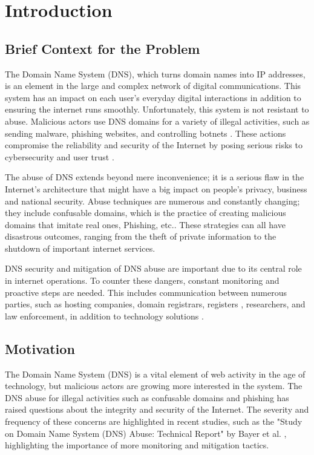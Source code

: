 \chapter{Introduction}


\section{Brief Context for the Problem}

The Domain Name System (DNS), which turns domain names into IP addresses, is an element in the large and complex network of digital communications. This system has an impact on each user's everyday digital interactions in addition to ensuring the internet runs smoothly. Unfortunately, this system is not resistant to abuse. Malicious actors use DNS domains for a variety of illegal activities, such as sending malware, phishing websites, and controlling botnets \cite{so2022}. These actions compromise the reliability and security of the Internet by posing serious risks to cybersecurity and user trust \cite{bayer2022}.

The abuse of DNS extends beyond mere inconvenience; it is a serious flaw in the Internet's architecture that might have a big impact on people's privacy, business and national security. Abuse techniques are numerous and constantly changing; they include confusable domains, which is the practice of creating malicious domains that imitate real ones, Phishing, etc.\cite{tatang2021}. These strategies can all have disastrous outcomes, ranging from the theft of private information to the shutdown of important internet services.

DNS security and mitigation of DNS abuse are important due to its central role in internet operations. To counter these dangers, constant monitoring and proactive steps are needed. This includes communication between numerous parties, such as hosting companies, domain registrars, registers , researchers, and law enforcement, in addition to technology solutions \cite{holdmann2019}.

\section{Motivation}

The Domain Name System (DNS) is a vital element of web activity in the age of technology, but malicious actors are growing more interested in the system. The DNS abuse for illegal activities such as confusable domains and phishing has raised questions about the integrity and security of the Internet. The severity and frequency of these concerns are highlighted in recent studies, such as the "Study on Domain Name System (DNS) Abuse: Technical Report" by Bayer et al. \cite{bayer2022}, highlighting the importance of more monitoring and mitigation tactics.


